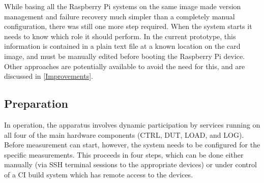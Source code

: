 While basing all the Raspberry Pi systems on the same image made version management and failure recovery much simpler than a completely manual configuration, there was still one more step required. When the system starts it needs to know which role it should perform. In the current prototype, this information is contained in a plain text file at a known location on the card image, and must be manually edited before booting the Raspberry Pi device. Other approaches are potentially available to avoid the need for this, and are discussed in \autoref{Improvements}.

\subsection{Preparation}
\label{Preparation}

In operation, the apparatus involves dynamic participation by services running on all four of the main hardware components (CTRL, DUT, LOAD, and LOG). Before measurement can start, however, the system needs to be configured for the specific measurements. This proceeds in four steps, which can be done either manually (via SSH terminal sessions to the appropriate devices) or under control of a CI build system which has remote access to the devices.

